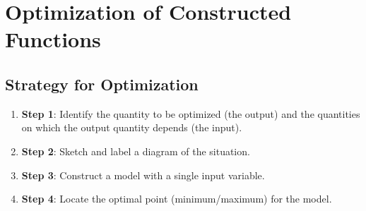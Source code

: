 \documentclass[notes]{subfiles}
\begin{document}
	\setcounter{section}{6}
	\setcounter{ex}{0}
	\fancyhead[LO,RE]{\bfseries  \currentname}
	\fancyfoot[C]{{}}
	\fancyfoot[RO,LE]{\large \thepage}	%


\section*{Optimization of Constructed Functions}\label{cs46}
	\subsection*{Strategy for Optimization}
		\begin{enumerate}[]
			\item \textbf{Step 1}: Identify the quantity to be optimized (the output) and the quantities on which the output quantity depends (the input).
			\item \textbf{Step 2}: Sketch and label a diagram of the situation.
			\item \textbf{Step 3}: Construct a model with a single input variable.
			\item \textbf{Step 4}: Locate the optimal point (minimum/maximum) for the model.
		\end{enumerate}
		
\end{document}
